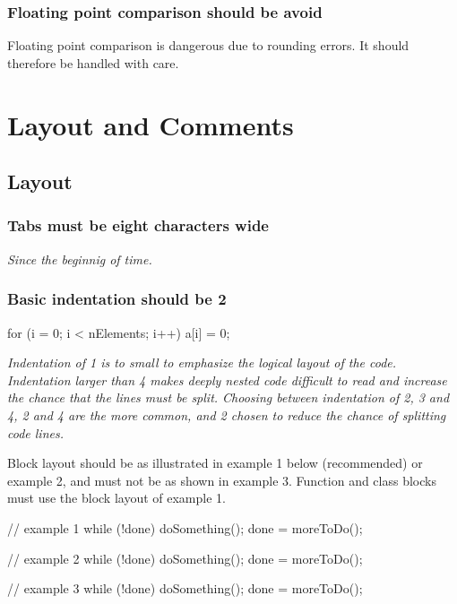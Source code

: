 \documentclass[a4paper,11pt,oneside]{scrbook}
\newcommand{\guideline}[1]{{\subsection{#1}}}
\newcommand{\motivation}[1]{{\normalfont \itshape #1}}
\begin{document}
\guideline{Floating point comparison should be avoid}

Floating point comparison is dangerous due to rounding errors. It should therefore
be handled with care.

\chapter{Layout and Comments}

\section{Layout}

\guideline{Tabs must be eight characters wide}

\motivation{
  Since the beginnig of time.
}

\guideline{Basic indentation should be 2}

\begin{code}
  for (i = 0; i < nElements; i++) {
    a[i] = 0; 
  }
\end{code}

\motivation{ 
  Indentation of 1 is to small to emphasize the logical
  layout of the code. Indentation larger than 4 makes deeply nested
  code difficult to read and increase the chance that the lines must
  be split. Choosing between indentation of 2, 3 and 4, 2 and 4 are
  the more common, and 2 chosen to reduce the chance of splitting code
  lines.
}

Block layout should be as illustrated in example 1 below (recommended)
or example 2, and must not be as shown in example 3. Function and
class blocks must use the block layout of example 1.

\begin{code}
  // example 1
  while (!done) {
    doSomething();
    done = moreToDo();
  }

  // example 2
  while (!done)
  {
    doSomething();
    done = moreToDo();
  }

  // example 3
  while (!done)
    {
      doSomething();
      done = moreToDo();
    }
\end{code}
\end{document}
